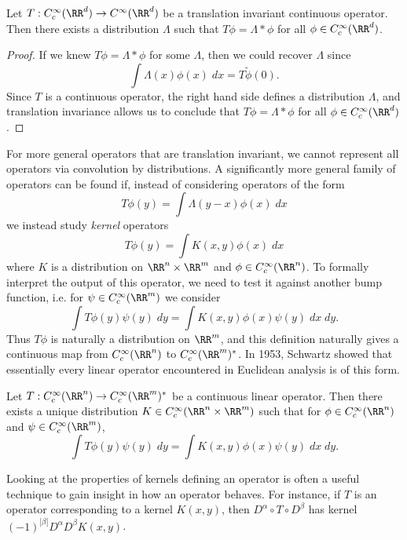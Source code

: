 \begin{theorem}
  Let $T: C_c^\infty(\RR^d) \to C^\infty(\RR^d)$ be a translation invariant continuous operator. Then there exists a distribution $\Lambda$ such that $T\phi = \Lambda * \phi$ for all $\phi \in C_c^\infty(\RR^d)$.
\end{theorem}
\begin{proof}
  If we knew $T\phi = \Lambda * \phi$ for some $\Lambda$, then we could recover $\Lambda$ since
  \[ \int \Lambda(x) \phi(x)\; dx = T \tilde{\phi}(0). \]
  Since $T$ is a continuous operator, the right hand side defines a distribution $\Lambda$, and translation invariance allows us to conclude that $T\phi = \Lambda * \phi$ for all $\phi \in C_c^\infty(\RR^d)$.
\end{proof}

For more general operators that are translation invariant, we cannot represent all operators via convolution by distributions. A significantly more general family of operators can be found if, instead of considering operators of the form
%
\[ T\phi(y) = \int \Lambda(y - x) \phi(x)\; dx \]
%
we instead study \emph{kernel} operators
%
\[ T\phi(y) = \int K(x,y) \phi(x)\; dx \]
%
where $K$ is a distribution on $\RR^n \times \RR^m$ and $\phi \in C_c^\infty(\RR^n)$. To formally interpret the output of this operator, we need to test it against another bump function, i.e. for $\psi \in C_c^\infty(\RR^m)$ we consider
%
\[ \int T\phi(y) \psi(y)\; dy = \int K(x,y) \phi(x) \psi(y)\; dx\; dy. \]
%
Thus $T\phi$ is naturally a distribution on $\RR^m$, and this definition naturally gives a continuous map from $C_c^\infty(\RR^n)$ to $C_c^\infty(\RR^m)^*$. In 1953, Schwartz showed that essentially every linear operator encountered in Euclidean analysis is of this form.

\begin{theorem}
  Let $T: C_c^\infty(\RR^n) \to C_c^\infty(\RR^m)^*$ be a continuous linear operator. Then there exists a unique distribution $K \in C_c^\infty(\RR^n \times \RR^m)$ such that for $\phi \in C_c^\infty(\RR^n)$ and $\psi \in C_c^\infty(\RR^m)$,
  \[ \int T\phi(y) \psi(y)\; dy = \int K(x,y) \phi(x) \psi(y)\; dx\; dy. \]
\end{theorem}

Looking at the properties of kernels defining an operator is often a useful technique to gain insight in how an operator behaves. For instance, if $T$ is an operator corresponding to a kernel $K(x,y)$, then $D^\alpha \circ T \circ D^\beta$ has kernel $(-1)^{|\beta|} D^\alpha D^\beta K(x,y)$.


